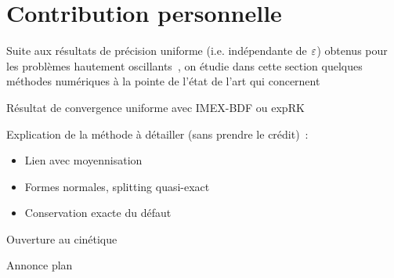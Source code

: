 \section*{Contribution personnelle}


Suite aux résultats de précision uniforme (i.e. indépendante de $\varepsilon$) obtenus pour les problèmes hautement oscillants~\cite{chartier.2015.uniformly,chartier.2020.new,crouseilles.2017.nonlinear}, on étudie dans cette section quelques méthodes numériques à la pointe de l'état de l'art qui concernent 

Résultat de convergence uniforme avec IMEX-BDF ou expRK

Explication de la méthode à détailler (sans prendre le crédit)~:
\begin{itemize}
    \item Lien avec moyennisation
    \item Formes normales, splitting quasi-exact
    \item Conservation exacte du défaut
\end{itemize}

Ouverture au cinétique

Annonce plan